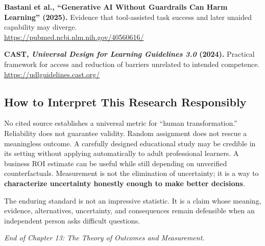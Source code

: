 \begin{enumerate}[label={[\textbf{M\arabic*}]}, leftmargin=2em, itemsep=0.6em]
    \item \textbf{Bastani et al., ``Generative AI Without Guardrails Can Harm Learning'' (2025).} Evidence that tool-assisted task success and later unaided capability may diverge. \\
    \url{https://pubmed.ncbi.nlm.nih.gov/40560616/}
    \item \textbf{CAST, \emph{Universal Design for Learning Guidelines 3.0} (2024).} Practical framework for access and reduction of barriers unrelated to intended competence. \\
    \url{https://udlguidelines.cast.org/}
\end{enumerate}

\subsection*{How to Interpret This Research Responsibly}

No cited source establishes a universal metric for ``human transformation.'' Reliability does not guarantee validity. Random assignment does not rescue a meaningless outcome. A carefully designed educational study may be credible in its setting without applying automatically to adult professional learners. A business ROI estimate can be useful while still depending on unverified counterfactuals. Measurement is not the elimination of uncertainty; it is a way to \textbf{characterize uncertainty honestly enough to make better decisions}.

The enduring standard is not an impressive statistic. It is a claim whose meaning, evidence, alternatives, uncertainty, and consequences remain defensible when an independent person asks difficult questions.

\vspace{1.5em}
\noindent\emph{End of Chapter 13: The Theory of Outcomes and Measurement.}
